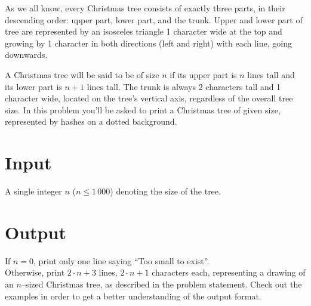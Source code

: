 \documentclass[en]{spiral}
\begin{document}
  \makeheader

  As we all know, every Christmas tree consists of exactly three parts,
  in their descending order: upper part, lower part, and the trunk.
  Upper and lower part of tree are represented by an isosceles triangle 1 character wide
  at the top and growing by 1 character in both directions (left and right) 
  with each line, going downwards.
  
  A Christmas tree will be said to be of size $n$ if its upper part
  is $n$ lines tall and its lower part is $n + 1$ lines tall. 
  The trunk is always 2 characters tall and 1 character wide, located on
  the tree's vertical axis, regardless of the overall tree size.
  In this problem you'll be asked to print a Christmas tree of given size,
  represented by hashes on a dotted background.

  \section{Input}

    A single integer $n$ ($n \leq 1\,000$) denoting the size of the tree.

  \section{Output}

    If $n=0$, print only one line saying ``Too small to exist''.\\
    Otherwise, print $2 \cdot n + 3$ lines, $2 \cdot n + 1$ characters each, representing a drawing 
    of an $n$–sized Christmas tree, as described in the problem statement.
    Check out the examples in order to get a better understanding of the output format.

\end{document}
